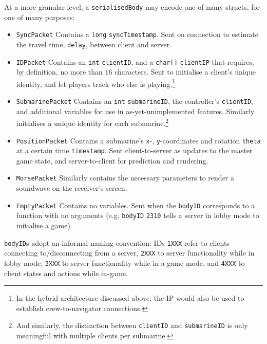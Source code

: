 \documentclass[a4paper, 9pt]{article}
\begin{document}
\begin{flushleft}
\vspace{5pt}\noindent
At a more granular level, a \texttt{serialisedBody} may encode one of many structs, for one of many purposes:
\begin{itemize}[noitemsep]
\item \texttt{SyncPacket} Contains a \texttt{long} \texttt{syncTimestamp}. Sent on connection to estimate the travel time, \texttt{delay}, between client and server.
\item \texttt{IDPacket} Contains an \texttt{int} \texttt{clientID}, and a \texttt{char[]} \texttt{clientIP} that requires, by definition, no more than $16$ characters. Sent to initialise a client's unique identity, and let players track who else is playing.\footnote{In the hybrid architecture discussed above, the IP would also be used to establish crew-to-navigator connections.}
\item \texttt{SubmarinePacket} Contains an \texttt{int} \texttt{submarineID}, the controller's \texttt{clientID}, and additional variables for use in as-yet-unimplemented features. Similarly initialises a unique identity for each submarine.\footnote{And similarly, the distinction between \texttt{clientID} and \texttt{submarineID} is only meaningful with multiple clients per submarine.}
\item \texttt{PositionPacket} Contains a submarine's \texttt{x}-, \texttt{y}-coordinates and rotation \texttt{theta} at a certain time \texttt{timestamp}. Sent client-to-server as updates to the master game state, and server-to-client for prediction and rendering.
\item \texttt{MorsePacket} Similarly contains the necessary parameters to render a soundwave on the receiver's screen.
\item \texttt{EmptyPacket} Contains no variables. Sent when the \texttt{bodyID} corresponds to a function with no arguments (e.g. \texttt{bodyID} \texttt{2310} tells a server in lobby mode to initialise a game).
\end{itemize}
\texttt{bodyID}s adopt an informal naming convention: IDs \texttt{1XXX} refer to clients connecting to/disconnecting from a server, \texttt{2XXX} to server functionality while in lobby mode, \texttt{3XXX} to server functionality while in a game mode, and \texttt{4XXX} to client states and actions while in-game.


\end{flushleft}
\end{document}
